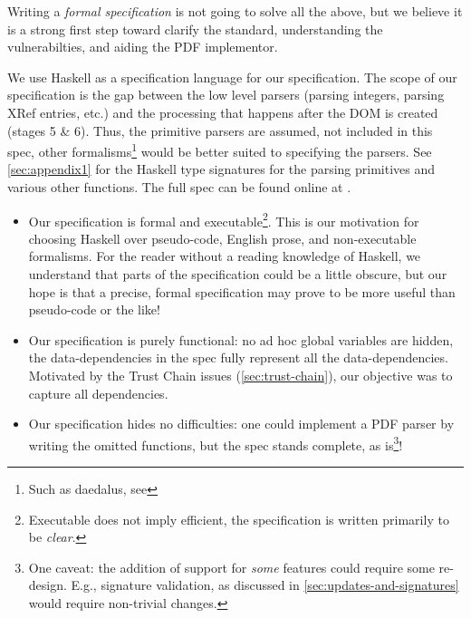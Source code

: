 Writing a \emph{formal specification} is not going to solve all the above,
but we believe it is a strong first step toward clarify the
standard, understanding the vulnerabilties, and aiding the PDF implementor.

We use Haskell \cite{Haskell} as a specification language for
our specification.
%
The scope of our specification is the gap between the low
level parsers (parsing integers, parsing XRef entries, etc.) and the
processing that happens after the DOM is created (stages 5 \& 6).
%
Thus, the primitive parsers are assumed, not included in this spec,
other formalisms\footnote{Such as daedalus, see \todo{}
} would be better suited to specifying the parsers.
See \cref{sec:appendix1} for the Haskell type signatures for the
parsing primitives and various other functions.
%
The full spec can be found online at \cite{daedalusrepo}.

\begin{itemize}
\item Our specification is formal and executable\footnote{
  Executable does not imply efficient, the specification is written
  primarily to be \emph{clear}.}.
  This is our motivation for choosing Haskell over pseudo-code,
  English prose, and non-executable formalisms.  For the reader
  without a reading knowledge of Haskell, we understand that parts of
  the specification could be a little obscure, but our hope is that a
  precise, formal specification may prove to be more useful than
  pseudo-code or the like!
  
\item Our specification is purely functional: no ad hoc global variables are
  hidden, the data-dependencies in the spec fully represent all the
  data-dependencies.  Motivated by the Trust Chain issues
  (\cref{sec:trust-chain}), our objective was to capture all dependencies.
  
\item Our specification hides no difficulties: one could implement a PDF parser
  by writing the omitted functions, but the spec stands complete, as
  is\footnote{One caveat: the addition of support for \emph{some} features
  could require some re-design.  E.g., signature validation, as discussed in
  \cref{sec:updates-and-signatures} would require non-trivial changes.
  }!
\end{itemize}

